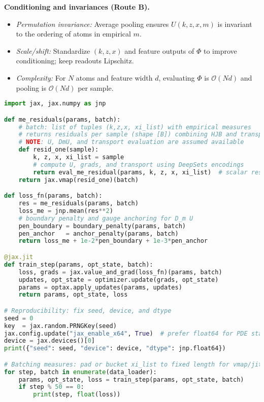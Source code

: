 ﻿\documentclass[11pt,letterpaper,oneside]{article}
\numberwithin{equation}{section}
\newcommand{\1}{\mathbf{1}}
\begin{document}
\begin{tcolorbox}[didacticstyle]
\begin{itemize}[leftmargin=1.1em,itemsep=0.25em]
\begin{tcolorbox}[mathstyle]
\textbf{Conditioning and invariances (Route B).}
\begin{itemize}[leftmargin=1.15em,itemsep=0.25em]
  \item \emph{Permutation invariance:} Average pooling ensures $U(k,z,x,m)$ is invariant to the ordering of atoms in empirical $m$.
  \item \emph{Scale/shift:} Standardize $(k,z,x)$ and feature outputs of $\Phi$ to improve conditioning; keep readouts Lipschitz.
  \item \emph{Complexity:} For $N$ atoms and feature width $d$, evaluating $\Phi$ is $\mathcal O(N d)$ and pooling is $\mathcal O(N d)$ per sample.
\end{itemize}
\end{tcolorbox}

\begin{lstlisting}[language=Python,caption={Pseudo-JAX training loop for Route B (ME residual minimization)}]
import jax, jax.numpy as jnp

def me_residuals(params, batch):
    # batch: list of tuples (k,z,x, xi_list) with empirical measures
    # returns residuals per sample (shape [B]) combining HJB and transport terms
    # NOTE: U, DmU, and transport evaluation are assumed available
    def resid_one(sample):
        k, z, x, xi_list = sample
        # compute U, grads, and transport using DeepSets encodings
        return eval_me_residual(params, k, z, x, xi_list)  # scalar residual
    return jax.vmap(resid_one)(batch)

def loss_fn(params, batch):
    res = me_residuals(params, batch)
    loss_me = jnp.mean(res**2)
    # boundary penalty and gauge anchoring for D_m U
    pen_boundary = boundary_penalty(params, batch)
    pen_anchor   = anchor_penalty(params, batch)
    return loss_me + 1e-2*pen_boundary + 1e-3*pen_anchor

@jax.jit
def train_step(params, opt_state, batch):
    loss, grads = jax.value_and_grad(loss_fn)(params, batch)
    updates, opt_state = optimizer.update(grads, opt_state)
    params = optax.apply_updates(params, updates)
    return params, opt_state, loss

# Reproducibility: fix seed, device, and dtype
seed = 0
key  = jax.random.PRNGKey(seed)
jax.config.update("jax_enable_x64", True)  # prefer float64 for PDE stability
device = jax.devices()[0]
print({"seed": seed, "device": device, "dtype": jnp.float64})

# Batching measures: pad or bucket xi_list to fixed length for vmap/jit
for step, batch in enumerate(data_loader):
    params, opt_state, loss = train_step(params, opt_state, batch)
    if step % 50 == 0:
        print(step, float(loss))
\end{lstlisting}


\end{itemize}
\end{tcolorbox}
\end{document}
